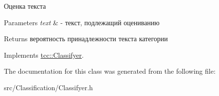 Оценка текста 


\begin{DoxyParams}{Parameters}
{\em text} & -\/ текст, подлежащий оцениванию \\
\hline
\end{DoxyParams}
\begin{DoxyReturn}{Returns}
вероятность принадлежности текста категории 
\end{DoxyReturn}


Implements \hyperlink{classtcc_1_1_classifyer_a13db939fe0720f111df9266e1eef54c0}{tcc\+::\+Classifyer}.



The documentation for this class was generated from the following file\+:\begin{DoxyCompactItemize}
\item 
src/\+Classification/Classifyer.\+h\end{DoxyCompactItemize}
